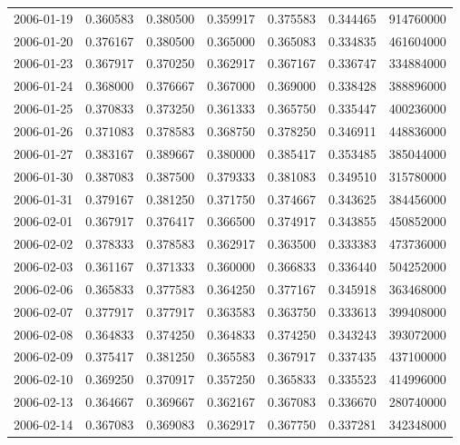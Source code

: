 \begin{tabular}{lrrrrrr}
2006-01-19 &    0.360583 &    0.380500 &    0.359917 &    0.375583 &    0.344465 &   914760000 \\
2006-01-20 &    0.376167 &    0.380500 &    0.365000 &    0.365083 &    0.334835 &   461604000 \\
2006-01-23 &    0.367917 &    0.370250 &    0.362917 &    0.367167 &    0.336747 &   334884000 \\
2006-01-24 &    0.368000 &    0.376667 &    0.367000 &    0.369000 &    0.338428 &   388896000 \\
2006-01-25 &    0.370833 &    0.373250 &    0.361333 &    0.365750 &    0.335447 &   400236000 \\
2006-01-26 &    0.371083 &    0.378583 &    0.368750 &    0.378250 &    0.346911 &   448836000 \\
2006-01-27 &    0.383167 &    0.389667 &    0.380000 &    0.385417 &    0.353485 &   385044000 \\
2006-01-30 &    0.387083 &    0.387500 &    0.379333 &    0.381083 &    0.349510 &   315780000 \\
2006-01-31 &    0.379167 &    0.381250 &    0.371750 &    0.374667 &    0.343625 &   384456000 \\
2006-02-01 &    0.367917 &    0.376417 &    0.366500 &    0.374917 &    0.343855 &   450852000 \\
2006-02-02 &    0.378333 &    0.378583 &    0.362917 &    0.363500 &    0.333383 &   473736000 \\
2006-02-03 &    0.361167 &    0.371333 &    0.360000 &    0.366833 &    0.336440 &   504252000 \\
2006-02-06 &    0.365833 &    0.377583 &    0.364250 &    0.377167 &    0.345918 &   363468000 \\
2006-02-07 &    0.377917 &    0.377917 &    0.363583 &    0.363750 &    0.333613 &   399408000 \\
2006-02-08 &    0.364833 &    0.374250 &    0.364833 &    0.374250 &    0.343243 &   393072000 \\
2006-02-09 &    0.375417 &    0.381250 &    0.365583 &    0.367917 &    0.337435 &   437100000 \\
2006-02-10 &    0.369250 &    0.370917 &    0.357250 &    0.365833 &    0.335523 &   414996000 \\
2006-02-13 &    0.364667 &    0.369667 &    0.362167 &    0.367083 &    0.336670 &   280740000 \\
2006-02-14 &    0.367083 &    0.369083 &    0.362917 &    0.367750 &    0.337281 &   342348000 \\

\end{tabular}
